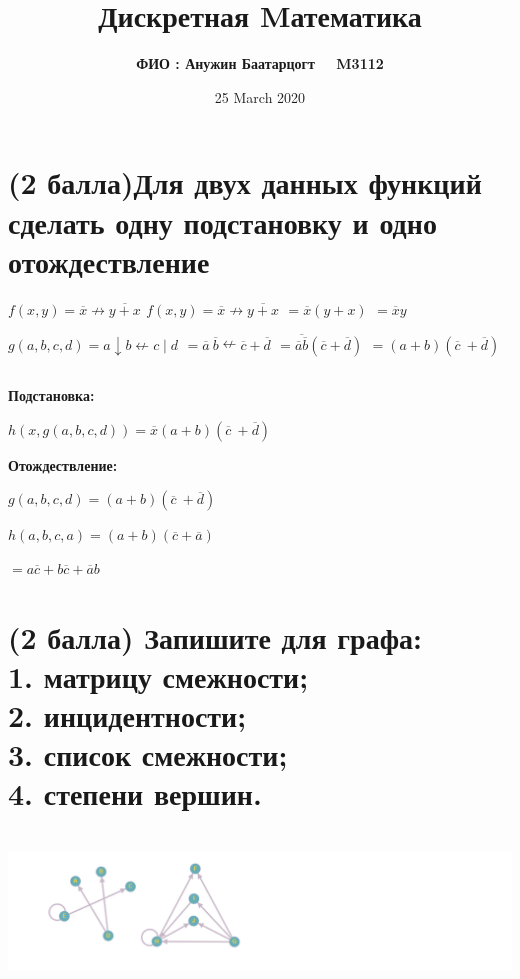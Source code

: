 \documentclass{article}
\title{ \textbf{Дискретная Mатематика} }
\author{\textbf{ФИО : Анужин Баатарцогт \ \ M3112}  }
\date{25 March 2020}
\begin{document}
\maketitle
\vspace{-0.15in}
	\vspace{0.05in}
	
\section{\Large{(2 балла)Для двух данных функций сделать одну подстановку и одно отождествление}}
\Large{\textbf{$f(x, y) = \overline{x} \nrightarrow \overline{y+x}$
$f(x, y) = \overline{x} \nrightarrow \overline{y+x}$
$= \overline{x}({y+x}) $
$= \overline{x}{y} $
}}

\bigskip

\textbf{$g(a , b , c, d) = a \downarrow b \nleftarrow {c \mid d} $
$= \overline{a} \ \overline{b} \nleftarrow{\overline{c} + \overline{d}}$
$= \overline{\overline{a}  \overline{b}}(\overline{c} + \overline{d})$
$= (a+b)(\overline{c} \ + \overline{d})$}

\subsection*{}
\textbf{Подстановка:}

$h(x, g(a,b,c,d))= \overline{x}(a+b)(\overline{c} \ + \overline{d})$
\bigskip

\textbf{Отождествление:}

$g(a , b , c, d) = {(a+b)}(\overline{c} \ + \overline{d})$

$h(a, b, c, a) = {(a+b)}(\overline {c} + \overline {a})$

$=  {a}\overline{c} + b\overline{c} + \overline{a}{b}$

\section{\Large{(2 балла) Запишите для графа:\newline\\1. матрицу смежности;\\
2. инцидентности;\\
3. список смежности;\\
4. степени вершин.}} \\ \newline \newline
\includegraphics[width=\textwidth,height=\textheight,keepaspectratio]{2.1.png}
\end{document}
